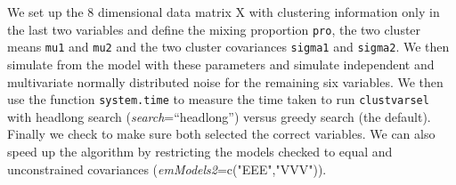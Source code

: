 \documentclass[,12pt]{article}
\newcommand{\Robject}[1]{{\texttt{#1}}}
\newcommand{\Rfunction}[1]{{\texttt{#1}}}
\newcommand{\Rfunarg}[1]{{\textit{#1}}}
\begin{document}
We set up the 8 dimensional data matrix X with clustering information only in the last two variables and define the mixing proportion \Robject{pro}, the two cluster means \Robject{mu1} and \Robject{mu2} and the two cluster covariances \Robject{sigma1} and \Robject{sigma2}. We then simulate from the model with these parameters and simulate independent and multivariate normally distributed noise for the remaining six variables. We then use the function \Rfunction{system.time} to measure the time taken to run \Rfunction{clustvarsel} with headlong search (\Rfunarg{search}=``headlong'') versus greedy search (the default). Finally we check to make sure both selected the correct variables. We can also speed up the algorithm by restricting the models checked to equal and unconstrained covariances (\Rfunarg{emModels2}=c("EEE","VVV")).
\end{document}
